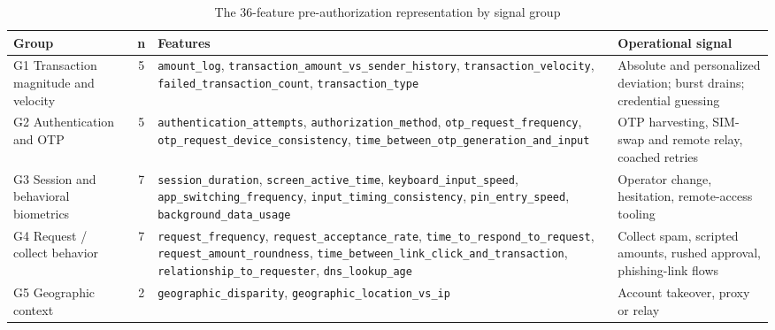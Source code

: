 \documentclass[conference]{IEEEtran}
\newcommand{\tabfont}{\footnotesize}
\begin{document}
\begin{table}[!t]
\caption{The 36-feature pre-authorization representation by signal group}\label{tab:feat}
\centering\tabfont
\begin{tabularx}{\textwidth}{@{}l c Y Y@{}}
\toprule
\textbf{Group} & \textbf{n} & \textbf{Features} & \textbf{Operational signal}\\
\midrule
G1 Transaction magnitude and velocity & 5 & \texttt{amount\_\allowbreak{}log}, \texttt{transaction\_\allowbreak{}amount\_\allowbreak{}vs\_\allowbreak{}sender\_\allowbreak{}history}, \texttt{transaction\_\allowbreak{}velocity}, \texttt{failed\_\allowbreak{}transaction\_\allowbreak{}count}, \texttt{transaction\_\allowbreak{}type} & Absolute and personalized deviation; burst drains; credential guessing\\
G2 Authentication and OTP & 5 & \texttt{authentication\_\allowbreak{}attempts}, \texttt{authorization\_\allowbreak{}method}, \texttt{otp\_\allowbreak{}request\_\allowbreak{}frequency}, \texttt{otp\_\allowbreak{}request\_\allowbreak{}device\_\allowbreak{}consistency}, \texttt{time\_\allowbreak{}between\_\allowbreak{}otp\_\allowbreak{}generation\_\allowbreak{}and\_\allowbreak{}input} & OTP harvesting, SIM-swap and remote relay, coached retries\\
G3 Session and behavioral biometrics & 7 & \texttt{session\_\allowbreak{}duration}, \texttt{screen\_\allowbreak{}active\_\allowbreak{}time}, \texttt{keyboard\_\allowbreak{}input\_\allowbreak{}speed}, \texttt{app\_\allowbreak{}switching\_\allowbreak{}frequency}, \texttt{input\_\allowbreak{}timing\_\allowbreak{}consistency}, \texttt{pin\_\allowbreak{}entry\_\allowbreak{}speed}, \texttt{background\_\allowbreak{}data\_\allowbreak{}usage} & Operator change, hesitation, remote-access tooling\\
G4 Request / collect behavior & 7 & \texttt{request\_\allowbreak{}frequency}, \texttt{request\_\allowbreak{}acceptance\_\allowbreak{}rate}, \texttt{time\_\allowbreak{}to\_\allowbreak{}respond\_\allowbreak{}to\_\allowbreak{}request}, \texttt{request\_\allowbreak{}amount\_\allowbreak{}roundness}, \texttt{time\_\allowbreak{}between\_\allowbreak{}link\_\allowbreak{}click\_\allowbreak{}and\_\allowbreak{}transaction}, \texttt{relationship\_\allowbreak{}to\_\allowbreak{}requester}, \texttt{dns\_\allowbreak{}lookup\_\allowbreak{}age} & Collect spam, scripted amounts, rushed approval, phishing-link flows\\
G5 Geographic context & 2 & \texttt{geographic\_\allowbreak{}disparity}, \texttt{geographic\_\allowbreak{}location\_\allowbreak{}vs\_\allowbreak{}ip} & Account takeover, proxy or relay\\

\end{tabularx}
\end{table}
\end{document}
